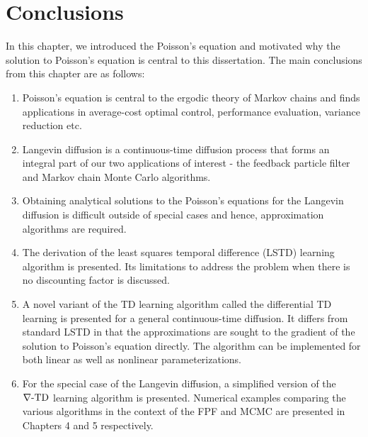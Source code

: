 \section{Conclusions}
In this chapter, we introduced the Poisson's equation and motivated why the solution to Poisson's equation is central to this dissertation. The main conclusions from this chapter are as follows:
\begin{enumerate}
	\item Poisson's equation is central to the ergodic theory of Markov chains and finds applications in average-cost optimal control, performance evaluation, variance reduction etc. 
	\item Langevin diffusion is a continuous-time diffusion process that forms an integral part of our two applications of interest - the feedback particle filter and Markov chain Monte Carlo algorithms. 
	\item Obtaining analytical solutions to the Poisson's equations for the Langevin diffusion is difficult outside of special cases and hence, approximation algorithms are required. 
	\item The derivation of the least squares temporal difference (LSTD) learning algorithm is presented. Its limitations to address the problem when there is no discounting factor is discussed. 
	\item A novel variant of the TD learning algorithm called the differential TD learning is presented for a general continuous-time diffusion. It differs from standard LSTD in that the approximations are sought to the gradient of the solution to Poisson's equation directly. The algorithm can be implemented for both linear as well as nonlinear parameterizations. 
	\item For the special case of the Langevin diffusion, a simplified version of the $\nabla\text{-TD}$ learning algorithm is presented. Numerical examples comparing the various algorithms in the context of the FPF and MCMC are presented in Chapters 4 and 5 respectively. 
\end{enumerate}




